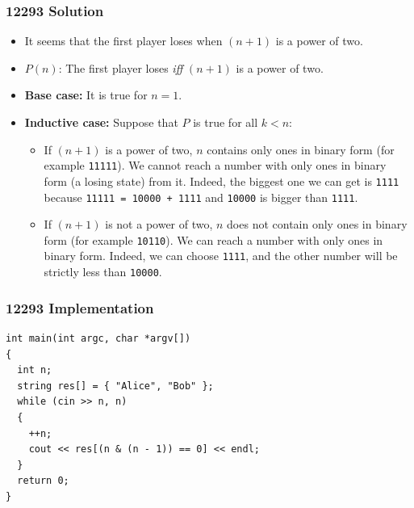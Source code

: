 \documentclass{beamer}
\begin{document}
\begin{frame}%
\frametitle{12293 Solution}
\scriptsize

\begin{itemize}

\item It seems that the first player loses when $(n + 1)$ is a power of two.

\vspace{0.2cm}

\item<2-> $P(n)$: The first player loses \emph{iff} $(n + 1)$ is a power of two.

\vspace{0.2cm}

\item<3-> \textbf{Base case:} It is true for $n = 1$.

\vspace{0.2cm}

\item<4-> \textbf{Inductive case:} Suppose that $P$ is true for all $k < n$:

\begin{itemize}
\scriptsize

\item<4-> If $(n + 1)$ is a power of two, $n$ contains only ones in binary form (for example \texttt{11111}).
 We cannot reach a number
with only ones in binary form (a losing state) from it.
Indeed, the biggest one we can get is \texttt{1111} because \texttt{11111 = 10000 + 1111} and \texttt{10000} is bigger than
\texttt{1111}.

\vspace{0.1cm}

\item<7-> If $(n + 1)$ is not a power of two, $n$ does not contain only ones in binary form (for example \texttt{10110}).
We can reach a number with only ones in binary form. Indeed, we can choose \texttt{1111}, and the other number will be strictly
less than \texttt{10000}.

\end{itemize}

\end{itemize}

\end{frame}

\begin{frame}[containsverbatim]
\frametitle{12293 Implementation}
\scriptsize

\begin{lstlisting}
int main(int argc, char *argv[])
{
  int n;
  string res[] = { "Alice", "Bob" };
  while (cin >> n, n)
  {
    ++n;
    cout << res[(n & (n - 1)) == 0] << endl;
  }
  return 0;
}
\end{lstlisting}

\end{frame}
\end{document}
